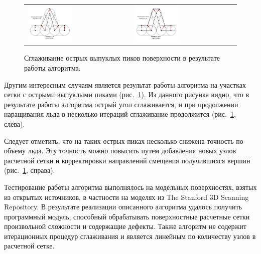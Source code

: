 \begin{figure}[h]
\centering
\begin{tabular}{ll}
\includegraphics[width=0.45\textwidth]{./pics/text_1_remesh_common_envelope/peak1.pdf}
&
\includegraphics[width=0.45\textwidth]{./pics/text_1_remesh_common_envelope/peak2.pdf}
\end{tabular}
\singlespacing
{}\caption{Сглаживание острых выпуклых пиков поверхности в результате работы алгоритма.}
\label{fig:text_1_remesh3_common_envelope_peak}
\end{figure}

Другим интересным случаям является результат работы алгоритма на участках сетки с острыми выпуклыми пиками (рис.~\ref{fig:text_1_remesh3_common_envelope_peak}).
Из данного рисунка видно, что в результате работы алгоритма острый угол сглаживается, и при продолжении наращивания льда в несколько итераций сглаживание продолжится (рис.~\ref{fig:text_1_remesh3_common_envelope_peak}, слева).

Следует отметить, что на таких острых пиках несколько снижена точность по объему льда.
Эту точность можно повысить путем добавления новых узлов расчетной сетки и корректировки направлений смещения получившихся вершин (рис.~\ref{fig:text_1_remesh3_common_envelope_peak}, справа).

Тестирование работы алгоритма выполнялось на модельных поверхностях, взятых из открытых источников, в частности на моделях из The Stanford 3D Scanning Repository.
В результате реализации описанного алгоритма удалось получить программный модуль, способный обрабатывать поверхностные расчетные сетки произвольной сложности и содержащие дефекты.
Также алгоритм не содержит итерационных процедур сглаживания и является линейным по количеству узлов в расчетной сетке.

